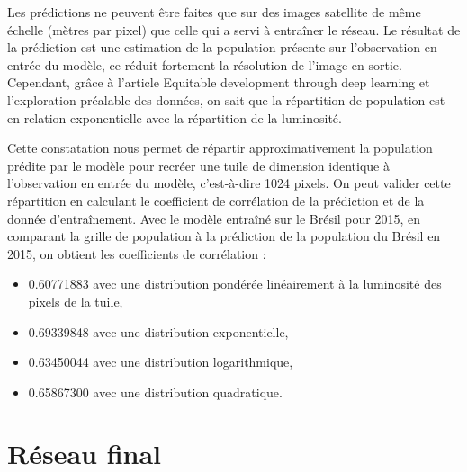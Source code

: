 \documentclass[a4paper, 11pt]{report}
\begin{document}
Les prédictions ne peuvent être faites que sur des images satellite de même échelle (mètres par pixel) que celle qui a servi à entraîner le réseau. Le résultat de la prédiction est une estimation de la population présente sur l'observation en entrée du modèle, ce réduit fortement la résolution de l'image en sortie. Cependant, grâce à l'article Equitable development through deep learning \cite{netpop-article} et l'exploration préalable des données, on sait que la répartition de population est en relation exponentielle avec la répartition de la luminosité.

Cette constatation nous permet de répartir approximativement la population prédite par le modèle pour recréer une tuile de dimension identique à l'observation en entrée du modèle, c'est-à-dire 1024 pixels. On peut valider cette répartition en calculant le coefficient de corrélation de la prédiction et de la donnée d'entraînement. Avec le modèle entraîné sur le Brésil pour 2015, en comparant la grille de population à la prédiction de la population du Brésil en 2015, on obtient les coefficients de corrélation :

\begin{itemize}
	\item 0.60771883 avec une distribution pondérée linéairement à la luminosité des pixels de la tuile,
	\item 0.69339848 avec une distribution exponentielle,
	\item 0.63450044 avec une distribution logarithmique,
	\item 0.65867300 avec une distribution quadratique.
\end{itemize}

\section{Réseau final}
\label{Réseaufinal}
\end{document}
